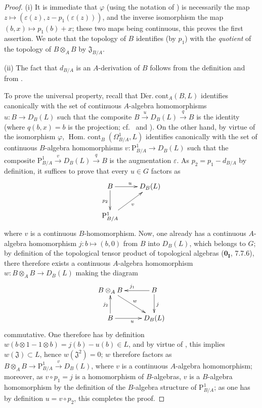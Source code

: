 \begin{proof}
(i) It is immediate that $\varphi$ (using the notation of ) is necessarily the map $z\mapsto(\varepsilon(z),z-p_1(\varepsilon(z)))$, and the inverse isomorphism the map $(b,x)\mapsto p_1(b)+x$; these two maps being continuous, this proves the first assertion.
We note that the topology of $B$ identifies (by $p_1$) with the \emph{quotient} of the topology of $B\otimes_A B$ by $\mathfrak{J}_{B/A}$.

(ii) The fact that $d_{B/A}$ is an $A$-derivation of $B$ follows from the definition  and from .

  To prove the universal property, recall that $\operatorname{D\acute{e}r.\ cont}_A(B,L)$ identifies canonically with the set of continuous $A$-algebra homomorphisms $u:B\to D_B(L)$ such that the composite $B\xrightarrow{u}D_B(L)\xrightarrow{q}B$ is the identity (where $q(b,x)=b$ is the projection; cf.\  and ).
On the other hand, by virtue of the isomorphism $\varphi$, $\operatorname{Hom.\ cont}_B(\Omega^1_{B/A},L)$ identifies canonically with the set of continuous $B$-algebra homomorphisms $v:\mathrm{P}^1_{B/A}\to D_B(L)$ such that the composite $\mathrm{P}^1_{B/A}\xrightarrow{v}D_B(L)\xrightarrow{q}B$ is the augmentation $\varepsilon$.
As $p_2=p_1-d_{B/A}$ by definition, it suffices to prove that every $u\in G$ factors as
\[
\xymatrix{
  B \ar[r]^u \ar[d]_{p_2} & D_B(L) \\
  \mathrm{P}^1_{B/A} \ar[ur]_v &
}
\]
where $v$ is a continuous $B$-homomorphism.
Now, one already has a continuous $A$-algebra homomorphism $j:b\mapsto(b,0)$ from $B$ into $D_B(L)$, which belongs to $G$; by definition of the topological tensor product of topological algebras ($\mathbf{0_I}$, 7.7.6), there therefore exists a continuous $A$-algebra homomorphism $w:B\otimes_A B\to D_B(L)$ making the diagram
\[
\xymatrix{
  B\otimes_A B \ar[dr]^w & B \ar[l]_{j_1} \ar[d]^j \\
  B \ar[u]^{j_2} \ar[r]_u & D_B(L)
}
\]
commutative.
\mbox{One} therefore has by definition $w(b\otimes 1-1\otimes b)=j(b)-u(b)\in L$, and by virtue of , this implies $w(\mathfrak{J})\subset L$, hence $w(\mathfrak{J}^2)=0$; $w$ therefore factors as $B\otimes_A B\to\mathrm{P}^1_{B/A}\xrightarrow{v}D_B(L)$, where $v$ is a continuous $A$-algebra homomorphism; moreover, as $v\circ p_1=j$ is a homomorphism of $B$-algebras, $v$ is a $B$-algebra homomorphism by the definition of the $B$-algebra structure of $\mathrm{P}^1_{B/A}$; as one has by definition $u=v\circ p_2$, this completes the proof.
\end{proof}

